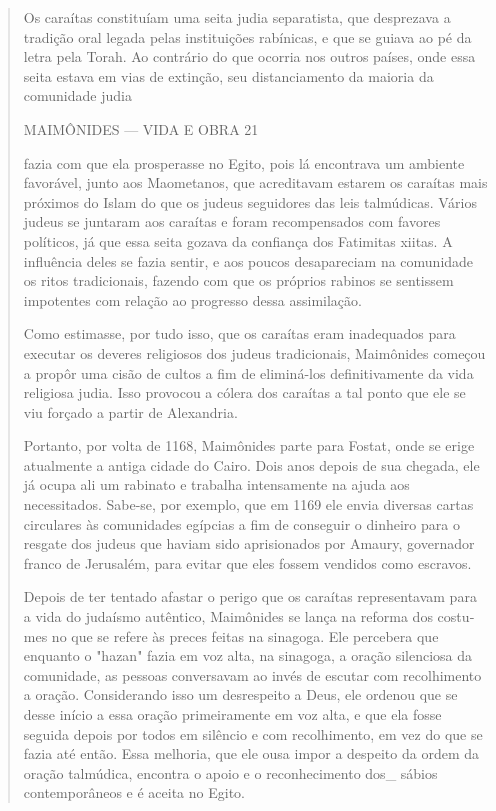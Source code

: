 \begin{quote}
Os caraítas constituíam uma seita judia separatista, que desprezava a
tradição oral legada pelas instituições rabínicas, e que se guiava ao pé
da letra pela Torah. Ao contrário do que ocorria nos outros países, onde
essa seita esta­va em vias de extinção, seu distanciamento da maioria da
comunidade judia

MAIMÔNIDES --- VIDA E OBRA 21

fazia com que ela prosperasse no Egito, pois lá encontrava um ambiente
favo­rável, junto aos Maometanos, que acreditavam estarem os caraítas
mais próxi­mos do Islam do que os judeus seguidores das leis talmúdicas.
Vários judeus se juntaram aos caraítas e foram recompensados com favores
políticos, já que essa seita gozava da confiança dos Fatimitas xiitas. A
influência deles se fazia sentir, e aos poucos desapareciam na
comunidade os ritos tradicionais, fazen­do com que os próprios rabinos
se sentissem impotentes com relação ao pro­gresso dessa assimilação.

Como estimasse, por tudo isso, que os caraítas eram inadequados para
executar os deveres religiosos dos judeus tradicionais, Maimônides
come­çou a propôr uma cisão de cultos a fim de eliminá-los
definitivamente da vida religiosa judia. Isso provocou a cólera dos
caraítas a tal ponto que ele se viu forçado a partir de Alexandria.

Portanto, por volta de 1168, Maimônides parte para Fostat, onde se erige
atualmente a antiga cidade do Cairo. Dois anos depois de sua chegada,
ele já ocupa ali um rabinato e trabalha intensamente na ajuda aos
necessitados. Sabe-se, por exemplo, que em 1169 ele envia diversas
cartas circulares às co­munidades egípcias a fim de conseguir o dinheiro
para o resgate dos judeus que haviam sido aprisionados por Amaury,
governador franco de Jerusalém, para evitar que eles fossem vendidos
como escravos.

Depois de ter tentado afastar o perigo que os caraítas representavam
para a vida do judaísmo autêntico, Maimônides se lança na reforma dos
costu­mes no que se refere às preces feitas na sinagoga. Ele percebera
que enquanto o "hazan" fazia em voz alta, na sinagoga, a oração
silenciosa da comunidade, as pessoas conversavam ao invés de escutar com
recolhimento a oração. Con­siderando isso um desrespeito a Deus, ele
ordenou que se desse início a essa oração primeiramente em voz alta, e
que ela fosse seguida depois por todos em silêncio e com recolhimento,
em vez do que se fazia até então. Essa melho­ria, que ele ousa impor a
despeito da ordem da oração talmúdica, encontra o apoio e o
reconhecimento dos\_ sábios contemporâneos e é aceita no Egito.


\end{quote}
